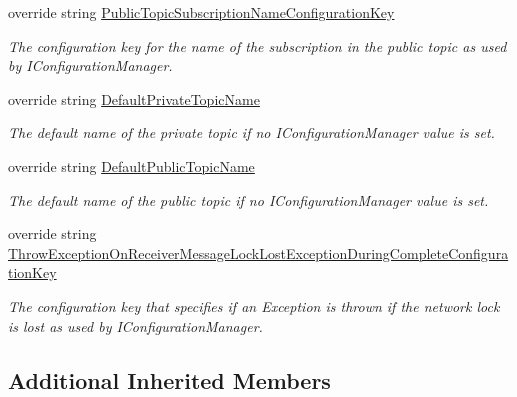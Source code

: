 \begin{DoxyCompactItemize}
override string \hyperlink{classCqrs_1_1Azure_1_1ServiceBus_1_1AzureEventBus_ad09814d0307b01d36fe981cf4b997e79_ad09814d0307b01d36fe981cf4b997e79}{Public\+Topic\+Subscription\+Name\+Configuration\+Key}
\begin{DoxyCompactList}\small\item\em The configuration key for the name of the subscription in the public topic as used by I\+Configuration\+Manager. \end{DoxyCompactList}\item 
override string \hyperlink{classCqrs_1_1Azure_1_1ServiceBus_1_1AzureEventBus_ad1951d2d7ccbf739e9390437d960b3f5_ad1951d2d7ccbf739e9390437d960b3f5}{Default\+Private\+Topic\+Name}
\begin{DoxyCompactList}\small\item\em The default name of the private topic if no I\+Configuration\+Manager value is set. \end{DoxyCompactList}\item 
override string \hyperlink{classCqrs_1_1Azure_1_1ServiceBus_1_1AzureEventBus_a252a4ac7c235b7fbb44849fbdb08b0eb_a252a4ac7c235b7fbb44849fbdb08b0eb}{Default\+Public\+Topic\+Name}
\begin{DoxyCompactList}\small\item\em The default name of the public topic if no I\+Configuration\+Manager value is set. \end{DoxyCompactList}\item 
override string \hyperlink{classCqrs_1_1Azure_1_1ServiceBus_1_1AzureEventBus_aaf0a0d07f6c5c1940cb633b362aa7177_aaf0a0d07f6c5c1940cb633b362aa7177}{Throw\+Exception\+On\+Receiver\+Message\+Lock\+Lost\+Exception\+During\+Complete\+Configuration\+Key}
\begin{DoxyCompactList}\small\item\em The configuration key that specifies if an Exception is thrown if the network lock is lost as used by I\+Configuration\+Manager. \end{DoxyCompactList}\end{DoxyCompactItemize}
\subsection*{Additional Inherited Members}



